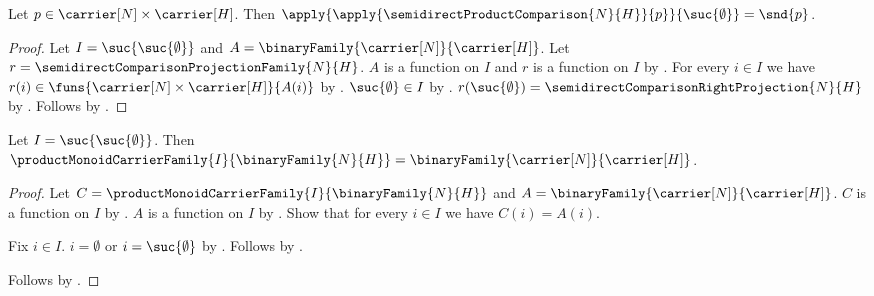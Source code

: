 \begin{proposition}\label{semidirect_product_comparison_right}
    Let $p\in\carrier[N]\times\carrier[H]$.
    Then
        $\apply{\apply{\semidirectProductComparison{N}{H}}{p}}
            {\suc{\emptyset}}=\snd{p}$.
\end{proposition}
\begin{proof}
    Let $I=\suc{\suc{\emptyset}}$ and
        $A=\binaryFamily{\carrier[N]}{\carrier[H]}$.
    Let $r=\semidirectComparisonProjectionFamily{N}{H}$.
    $A$ is a function on $I$ and $r$ is a function on $I$ by
        .
    For every $i\in I$ we have
        $r(i)\in\funs{\carrier[N]\times\carrier[H]}{A(i)}$ by
        .
    $\suc{\emptyset}\in I$ by .
    $r(\suc{\emptyset})=\semidirectComparisonRightProjection{N}{H}$ by
        .
    Follows by
        .
\end{proof}

\begin{proposition}\label{semidirect_binary_carrier_family}
    Let $I=\suc{\suc{\emptyset}}$.
    Then
        $\productMonoidCarrierFamily{I}{\binaryFamily{N}{H}}=
            \binaryFamily{\carrier[N]}{\carrier[H]}$.
\end{proposition}
\begin{proof}
    Let $C=\productMonoidCarrierFamily{I}{\binaryFamily{N}{H}}$ and
        $A=\binaryFamily{\carrier[N]}{\carrier[H]}$.
    $C$ is a function on $I$ by
        .
    $A$ is a function on $I$ by
        .
    Show that for every $i\in I$ we have $C(i)=A(i)$.
    \begin{subproof}
        Fix $i\in I$.
        $i=\emptyset$ or $i=\suc{\emptyset}$ by
            .
        Follows by
            .
    \end{subproof}
    Follows by .
\end{proof}

